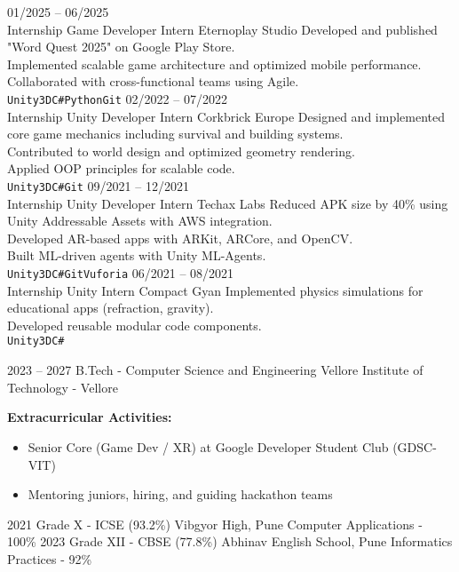 \documentclass[9pt]{developercv}
\begin{document}
	\begin{entrylist}
		\entry
		{01/2025 -- 06/2025\\\footnotesize{Internship}}
		{Game Developer Intern}
		{Eternoplay Studio}
		{
			Developed and published "Word Quest 2025" on Google Play Store.\\
			Implemented scalable game architecture and optimized mobile performance.\\
			Collaborated with cross-functional teams using Agile.\\
			\texttt{Unity3D}\slashsep\texttt{C\#}\slashsep\texttt{Python}\slashsep\texttt{Git}
		}
		\entry
		{02/2022 -- 07/2022\\\footnotesize{Internship}}
		{Unity Developer Intern}
		{Corkbrick Europe}
		{
			Designed and implemented core game mechanics including survival and building systems.\\
			Contributed to world design and optimized geometry rendering.\\
			Applied OOP principles for scalable code.\\
			\texttt{Unity3D}\slashsep\texttt{C\#}\slashsep\texttt{Git}
		}
		\entry
		{09/2021 -- 12/2021\\\footnotesize{Internship}}
		{Unity Developer Intern}
		{Techax Labs}
		{
			Reduced APK size by 40\% using Unity Addressable Assets with AWS integration.\\
			Developed AR-based apps with ARKit, ARCore, and OpenCV.\\
			Built ML-driven agents with Unity ML-Agents.\\
			\texttt{Unity3D}\slashsep\texttt{C\#}\slashsep\texttt{Git}\slashsep\texttt{Vuforia}
		}
		\entry
		{06/2021 -- 08/2021\\\footnotesize{Internship}}
		{Unity Intern}
		{Compact Gyan}
		{
			Implemented physics simulations for educational apps (refraction, gravity).\\
			Developed reusable modular code components.\\
			\texttt{Unity3D}\slashsep\texttt{C\#}
		}
	\end{entrylist}
	
	
	\cvsect{Education}
	
	\begin{entrylist}
		\entry
		{2023 -- 2027}
		{B.Tech - Computer Science and Engineering}
		{Vellore Institute of Technology - Vellore}
		{
			\textbf{Extracurricular Activities:}
			\begin{itemize}
				\item Senior Core (Game Dev / XR) at Google Developer Student Club (GDSC-VIT)
				\item Mentoring juniors, hiring, and guiding hackathon teams
			\end{itemize}
		}
		\entry
		{2021}
		{Grade X - ICSE (93.2\%)}
		{Vibgyor High, Pune}
		{Computer Applications - 100\%}
		\entry
		{2023}
		{Grade XII - CBSE (77.8\%)}
		{Abhinav English School, Pune}
		{Informatics Practices - 92\%}
	\end{entrylist}
	
\end{document}
